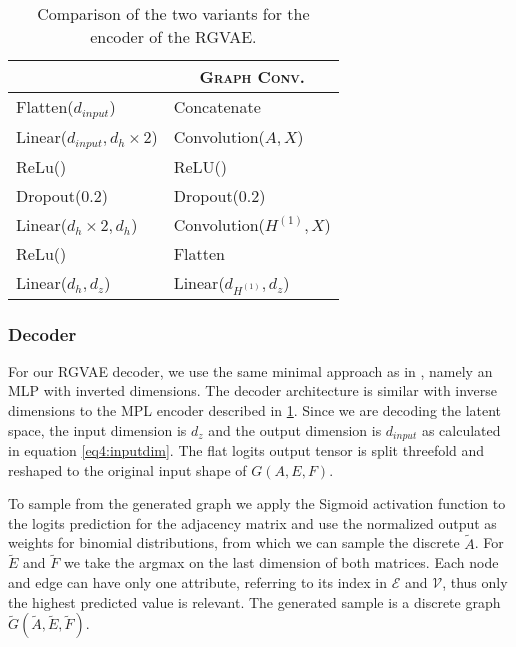 \begin{table}[H]
    \centering
        \begin{tabular}{|l|l|}
        \hline
        \rowcolor[HTML]{EFEFEF}
        \multicolumn{1}{|c}{\textsc{MLP}} & \multicolumn{1}{c}{\textsc{Graph Conv.}} \\\hline
        Flatten($d_{input}$) &   Concatenate \\
        Linear($d_{input},d_{h}\times 2$) &   Convolution($A,X$) \\
        ReLu() &   ReLU() \\   
        Dropout($0.2$) &   Dropout($0.2$) \\
        Linear($d_{h}\times 2,d_{h}$) &   Convolution($H^{(1)},X$) \\
        ReLu() &   Flatten \\
        Linear($d_{h},d_{z}$) &   Linear($d_{H^{(1)}},d_z$) \\
        \hline
        \end{tabular}
        \caption{Comparison of the two variants for the encoder of the RGVAE.}
        \label{tab4:archcompare}
    \end{table}

\subsubsection{Decoder}


For our RGVAE decoder, we use the same minimal approach as in \cite{simonovsky_graphvae_2018}, namely an MLP with inverted dimensions. The decoder architecture is similar with inverse dimensions to the MPL encoder described in \ref{tab4:archcompare}. Since we are decoding the latent space, the input dimension is $d_z$ and the output dimension is $d_{input}$ as calculated in equation \ref{eq4:inputdim}. The flat logits output tensor is split threefold and reshaped to the original input shape of $G(A,E,F)$.   



To sample from the generated graph we apply the Sigmoid activation function to the logits prediction for the adjacency matrix and use the normalized output as weights for binomial distributions, from which we can sample the discrete $\tilde{A}$. For $\tilde{E}$ and $\tilde{F}$ we take the argmax on the last dimension of both matrices. Each node and edge can have only one attribute, referring to its index in $\mathcal{E}$ and $\mathcal{V}$, thus only the highest predicted value is relevant. The generated sample is a discrete graph $\tilde{G}(\tilde{A},\tilde{E},\tilde{F})$.



